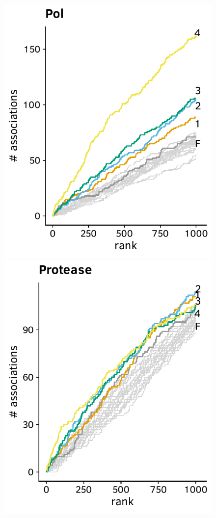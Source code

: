 \documentclass[a4paper,11pt]{article}
\begin{document}
\begin{figure}[H]
    \begin{minipage}{.40\textwidth}
      \includegraphics[width=\linewidth]{plots/comparison_plots/hiv_china/pol_new_map.pdf}
    \end{minipage}
    \hfill
    \begin{minipage}{.40\textwidth}
      \includegraphics[width=\linewidth]{plots/comparison_plots/hiv_china/protease_new_map.pdf}

\end{minipage}
\end{figure}
\end{document}
